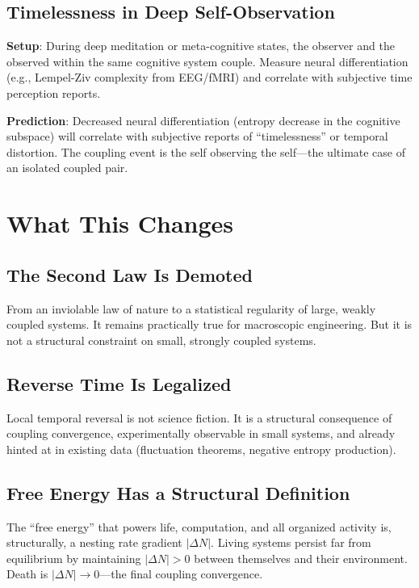 \documentclass[12pt,a4paper]{article}
\begin{document}
\subsection{Timelessness in Deep Self-Observation}

\textbf{Setup}: During deep meditation or meta-cognitive states, the observer and the observed within the same cognitive system couple. Measure neural differentiation (e.g., Lempel-Ziv complexity from EEG/fMRI) and correlate with subjective time perception reports.

\textbf{Prediction}: Decreased neural differentiation (entropy decrease in the cognitive subspace) will correlate with subjective reports of ``timelessness'' or temporal distortion. The coupling event is the self observing the self---the ultimate case of an isolated coupled pair.

\section{What This Changes}

\subsection{The Second Law Is Demoted}

From an inviolable law of nature to a statistical regularity of large, weakly coupled systems. It remains practically true for macroscopic engineering. But it is not a structural constraint on small, strongly coupled systems.

\subsection{Reverse Time Is Legalized}

Local temporal reversal is not science fiction. It is a structural consequence of coupling convergence, experimentally observable in small systems, and already hinted at in existing data (fluctuation theorems, negative entropy production).

\subsection{Free Energy Has a Structural Definition}

The ``free energy'' that powers life, computation, and all organized activity is, structurally, a nesting rate gradient $|\Delta N|$. Living systems persist far from equilibrium by maintaining $|\Delta N| > 0$ between themselves and their environment. Death is $|\Delta N| \to 0$---the final coupling convergence.
\end{document}
